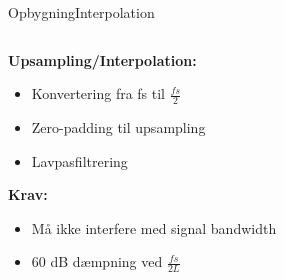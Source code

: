 \begin{frame}{Opbygning}{Interpolation}
	
	\begin{columns}
		\begin{column}{0.4\textwidth}
			\textbf{Upsampling/Interpolation:}
			\begin{itemize}
				\item Konvertering fra fs til $\frac{fs}{2}$
				\item Zero-padding til upsampling
				\item Lavpasfiltrering
			\end{itemize}
			\textbf{Krav:}
			\begin{itemize}
				\item Må ikke interfere med signal bandwidth
				\item 60 dB dæmpning ved $\frac{fs}{2L}$
			\end{itemize}
		\end{column}
		

\end{columns}
\end{frame}
